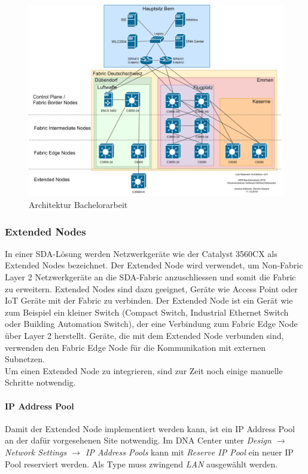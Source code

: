 \begin{figure}[H]
	\centering
	\includegraphics[width=1\linewidth]{img/Architecture/LabNetworkArchitecture-11-12}
	\caption{Architektur Bachelorarbeit}
	\label{fig:Architektur Bachelorarbeit}
\end{figure}

\subsubsection{Extended Nodes}
In einer SDA-Lösung werden Netzwerkgeräte wie der Catalyst 3560CX als Extended Nodes bezeichnet. Der  Extended Node wird verwendet, um Non-Fabric Layer 2 Netzwerkgeräte an die SDA-Fabric anzuschliessen und somit die Fabric zu erweitern. Extended Nodes sind dazu geeignet, Geräte wie Access Point oder IoT Geräte mit der Fabric zu verbinden.
Der Extended Node ist ein Gerät wie zum Beispiel ein kleiner Switch (Compact Switch, Industrial Ethernet Switch oder Building Automation Switch), der eine Verbindung zum Fabric Edge Node über Layer 2 herstellt. Geräte, die mit dem Extended Node verbunden sind, verwenden den Fabric Edge Node für die Kommunikation mit externen Subnetzen.  \\

Um einen Extended Node zu integrieren, sind zur Zeit noch einige manuelle Schritte notwendig.

\paragraph{IP Address Pool} Damit der Extended Node implementiert werden kann, ist ein IP Address Pool an der dafür vorgesehenen Site notwendig. Im DNA Center unter \textit{Design $\rightarrow$ Network Settings $\rightarrow$ IP Address Pools} kann mit \textit{Reserve IP Pool} ein neuer IP Pool reserviert werden. Als Type muss zwingend \textit{LAN} ausgewählt werden.

